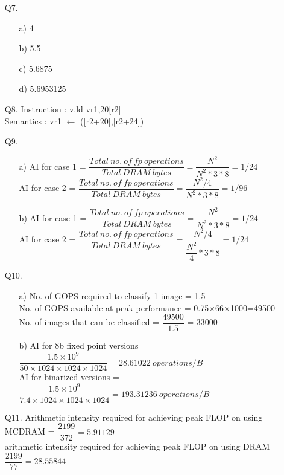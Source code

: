 \documentclass[letterpaper]{article}
\begin{document}
\begin{large}
\begin{flushleft}
\begin{enumerate}
\clearpage
\item[Q7. ]
\begin{enumerate}
\item[a) ]4
\item[b) ]5.5
\item[c) ]5.6875
\item[d) ]5.6953125
\end{enumerate}
\item[Q8. ]
Instruction : v.ld vr1,20[r2]\\[0.1in]
Semantics : vr1 $\leftarrow$ ([r2+20],[r2+24])\\[0.1in]
\item[Q9. ]
\begin{enumerate}
\item[a) ]
AI for case 1 = $\dfrac{Total\ no.\ of\ fp\ operations}{Total\ DRAM\ bytes}=\dfrac{N^2}{N^2*3*8}=1/24$\\[0.1in]
AI for case 2 = $\dfrac{Total\ no.\ of\ fp\ operations}{Total\ DRAM\ bytes}=\dfrac{N^2/4}{N^2*3*8}=1/96$\\[0.1in]
\item[b) ]
AI for case 1 = $\dfrac{Total\ no.\ of\ fp\ operations}{Total\ DRAM\ bytes}=\dfrac{N^2}{N^2*3*8}=1/24$\\[0.1in]
AI for case 2 = $\dfrac{Total\ no.\ of\ fp\ operations}{Total\ DRAM\ bytes}=\dfrac{N^2/4}{\dfrac{N^2}{4}*3*8}=1/24$\\[0.1in]
\end{enumerate}
\item[Q10. ]
\begin{enumerate}
\item[a) ]
No. of GOPS required to classify 1 image = 1.5\\[0.1in]
No. of GOPS available at peak performance = 0.75$\times$66$\times$1000=49500\\[0.1in]
No. of images that can be classified = $\dfrac{49500}{1.5}$ = 33000\\[0.1in]
\item[b) ]
AI for 8b fixed point versions = $\dfrac{1.5\times 10^{9}}{50 \times 1024 \times 1024 \times 1024}=28.61022\ operations/B$\\[0.1in]
AI for binarized versions = $\dfrac{1.5\times 10^{9}}{7.4 \times 1024 \times 1024 \times 1024}=193.31236\ operations/B$\\[0.1in]
\end{enumerate}
\item[Q11. ]
Arithmetic intensity required for achieving peak FLOP on using MCDRAM = $\dfrac{2199}{372}=5.91129$\\[0.1in]
arithmetic intensity required for achieving peak FLOP on using DRAM = $\dfrac{2199}{77}=28.55844$\\[0.1in]
\end{enumerate}
\end{flushleft}
\end{large}
\end{document}
